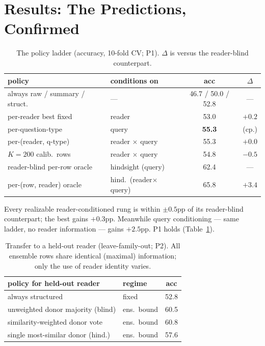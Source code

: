 \section{Results: The Predictions, Confirmed}
\label{sec:results}

\begin{table}[t]
\centering
\small
\begin{tabular}{@{}llcc@{}}
\toprule
policy & conditions on & acc & $\Delta$ \\
\midrule
always raw / summary / struct. & --- & 46.7 / 50.0 / 52.8 & --- \\
per-reader best fixed & reader & 53.0 & $+0.2$ \\
per-question-type & query & \textbf{55.3} & (cp.) \\
per-(reader, q-type) & reader $\times$ query & 55.3 & $+0.0$ \\
\quad $K{=}200$ calib.\ rows & reader $\times$ query & 54.8 & $-0.5$ \\
reader-blind per-row oracle & hindsight (query) & 62.4 & --- \\
per-(row, reader) oracle & hind.\ (reader$\times$query) & 65.8 & $+3.4$ \\
\bottomrule
\end{tabular}
\caption{The policy ladder (accuracy, 10-fold CV; P1). $\Delta$ is versus the
reader-blind counterpart.}
\label{tab:ladder}
\end{table}

Every realizable reader-conditioned rung is within $\pm0.5$pp of its
reader-blind counterpart; the best gains $+0.3$pp. Meanwhile query conditioning
--- same ladder, no reader information --- gains $+2.5$pp. P1 holds
(Table~\ref{tab:ladder}).

\begin{table}[t]
\centering
\small
\begin{tabular}{@{}llc@{}}
\toprule
policy for held-out reader & regime & acc \\
\midrule
always structured & fixed & 52.8 \\
unweighted donor majority (blind) & ens.\ bound & 60.5 \\
similarity-weighted donor vote & ens.\ bound & 60.8 \\
single most-similar donor (hind.) & ens.\ bound & 57.6 \\
\bottomrule
\end{tabular}
\caption{Transfer to a held-out reader (leave-family-out; P2). All ensemble rows
share identical (maximal) information; only the use of reader identity varies.}
\label{tab:transfer}
\end{table}


